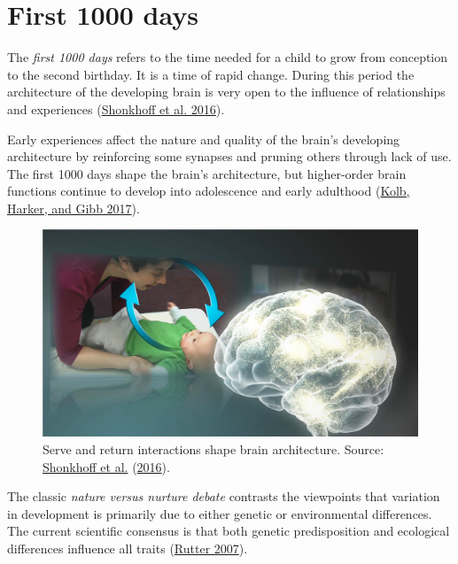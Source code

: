 \documentclass[
]{book}
\begin{document}
\hypertarget{sec:first1000}{%
\section{First 1000 days}\label{sec:first1000}}

The \emph{first 1000 days} refers to the time needed for a child to grow from conception to the second birthday. It is a time of rapid change. During this period the architecture of the developing brain is very open to the influence of relationships and experiences (\protect\hyperlink{ref-skonkhoff2016best}{Shonkhoff et al. 2016}).

Early experiences affect the nature and quality of the brain's developing architecture by reinforcing some synapses and pruning others through lack of use. The first 1000 days shape the brain's architecture, but higher-order brain functions continue to develop into adolescence and early adulthood (\protect\hyperlink{ref-kolb2017principles}{Kolb, Harker, and Gibb 2017}).

\begin{figure}

{\centering \includegraphics[width=1\linewidth]{fig/Shonkoff_Ch1} 

}

\caption{Serve and return interactions shape brain architecture. Source: \protect\hyperlink{ref-skonkhoff2016best}{Shonkhoff et al.} (\protect\hyperlink{ref-skonkhoff2016best}{2016}).}\label{fig:shonkoffplot}
\end{figure}



The classic \emph{nature versus nurture debate} contrasts the viewpoints that variation in development is primarily due to either genetic or environmental differences. The current scientific consensus is that both genetic predisposition and ecological differences influence all traits (\protect\hyperlink{ref-rutter2007genes}{Rutter 2007}).
\end{document}
